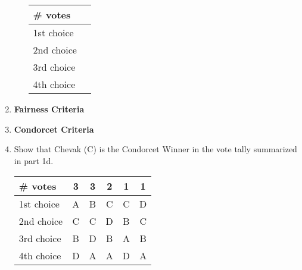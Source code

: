 \documentclass[12pt]{article}
\begin{document}
\begin{enumerate}
\begin{enumerate}
\begin{tabular}{l || c }
\# votes&\quad \hspace{4in} \quad\\
\hline
1st choice&\\
2nd choice&\\
3rd choice&\\
4th choice&\\
\end{tabular}

\end{enumerate}

\newpage

\item \textbf{Fairness Criteria}\\
\vfill

\item \textbf{Condorcet Criteria}\\
\vfill

\item Show that Chevak (C) is the Condorcet Winner in the vote tally summarized in part 1d.\\

\begin{tabular}{l || c |c|c|c|c}
\# votes&3&3&2&1&1\\
\hline
1st choice&A&B&C&C&D\\
2nd choice&C&C&D&B&C\\
3rd choice&B&D&B&A&B\\
4th choice&D&A&A&D&A\\
\end{tabular}

\vfill
\end{enumerate}
\end{document}
